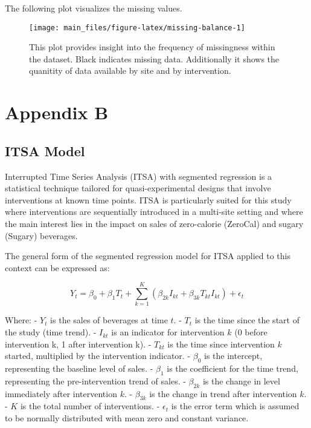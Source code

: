 \documentclass[
]{article}
\begin{document}
The following plot visualizes the missing values.

\begin{figure}

{\centering \texttt{[image: main\_files/figure-latex/missing-balance-1]} 

}

\caption{This plot provides insight into the frequency of missingness within the dataset. Black indicates missing data. Additionally it shows the quanitity of data available by site and by intervention.}\label{fig:missing-balance}
\end{figure}

\pagebreak

\hypertarget{appendix-b}{%
\section{Appendix B}\label{appendix-b}}

\hypertarget{itsa-model}{%
\subsection{ITSA Model}\label{itsa-model}}

Interrupted Time Series Analysis (ITSA) with segmented regression is a statistical technique tailored for quasi-experimental designs that involve interventions at known time points. ITSA is particularly suited for this study where interventions are sequentially introduced in a multi-site setting and where the main interest lies in the impact on sales of zero-calorie (ZeroCal) and sugary (Sugary) beverages.

The general form of the segmented regression model for ITSA applied to this context can be expressed as:

\[Y_t = \beta_0 + \beta_1 T_t + \sum_{k=1}^{K} (\beta_{2k} I_{kt} + \beta_{3k} T_{kt} I_{kt}) + \epsilon_t \]

Where:
- \(Y_t\) is the sales of beverages at time \(t\).
- \(T_t\) is the time since the start of the study (time trend).
- \(I_{kt}\) is an indicator for intervention \(k\) (0 before intervention k, 1 after intervention k).
- \(T_{kt}\) is the time since intervention \(k\) started, multiplied by the intervention indicator.
- \(\beta_0\) is the intercept, representing the baseline level of sales.
- \(\beta_1\) is the coefficient for the time trend, representing the pre-intervention trend of sales.
- \(\beta_{2k}\) is the change in level immediately after intervention \(k\).
- \(\beta_{3k}\) is the change in trend after intervention \(k\).
- \(K\) is the total number of interventions.
- \(\epsilon_t\) is the error term which is assumed to be normally distributed with mean zero and constant variance.
\end{document}
